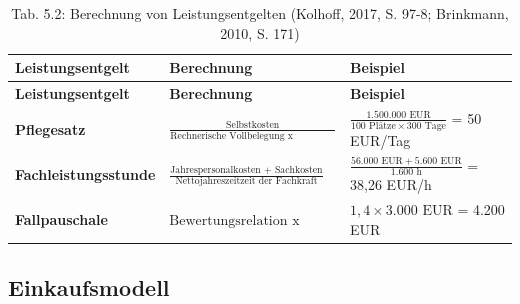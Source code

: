\documentclass[
  letterpaper,
]{book}
\begin{document}
\begin{longtable}[]{@{}
  >{\raggedright\arraybackslash}p{}
  >{\raggedright\arraybackslash}p{}
  >{\raggedright\arraybackslash}p{}@{}}
\caption{Tab. 5.2: Berechnung von Leistungsentgelten (Kolhoff, 2017, S.
97-8; Brinkmann, 2010, S. 171)}\tabularnewline
\toprule\noalign{}
\begin{minipage}[b]{\linewidth}\raggedright
\textbf{Leistungsentgelt}
\end{minipage} & \begin{minipage}[b]{\linewidth}\raggedright
\textbf{Berechnung}
\end{minipage} & \begin{minipage}[b]{\linewidth}\raggedright
\textbf{Beispiel}
\end{minipage} \\
\midrule\noalign{}
\endfirsthead
\toprule\noalign{}
\begin{minipage}[b]{\linewidth}\raggedright
\textbf{Leistungsentgelt}
\end{minipage} & \begin{minipage}[b]{\linewidth}\raggedright
\textbf{Berechnung}
\end{minipage} & \begin{minipage}[b]{\linewidth}\raggedright
\textbf{Beispiel}
\end{minipage} \\
\midrule\noalign{}
\endhead
\bottomrule\noalign{}
\endlastfoot
\textbf{Pflegesatz} &
\(\frac{\text{Selbstkosten}}{\text{Rechnerische Vollbelegung x Nutzungstage}}\)
&
\(\frac{1.500.000 \text{ EUR}}{100 \text{ Plätze} \times 300 \text{ Tage}}\)
= 50 EUR/Tag \\
\textbf{Fachleistungsstunde} &
\(\frac{\text{Jahrespersonalkosten + Sachkosten}}{\text{Nettojahreszeitzeit der Fachkraft}}\)
& \(\frac{56.000 \text{ EUR} + 5.600 \text{ EUR}}{1.600 \text{ h}}\) =
38,26 EUR/h \\
\textbf{Fallpauschale} & \(\text{Bewertungsrelation x Landesbasiswert}\)
& \(1,4 \times 3.000 \text{ EUR}\) = 4.200 EUR \\
\end{longtable}

\subsection{Einkaufsmodell}\label{einkaufsmodell}
\end{document}
